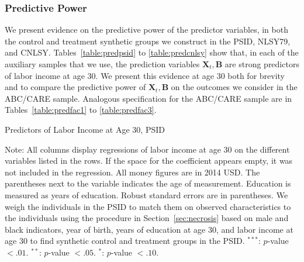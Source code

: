 \subsubsection{Predictive Power} \label{appendix:pred}

\noindent We present evidence on the predictive power of the predictor variables, in both the control and treatment synthetic groups we construct in the PSID, NLSY79, and CNLSY. Tables~\ref{table:predpsid} to \ref{table:predcnlsy} show that, in each of the auxiliary samples that we use, the prediction variables $\bm{X}_{t}, \bm{B}$ are strong predictors of labor income at age 30. We present this evidence at age 30 both for brevity and to compare the predictive power of $\bm{X}_{t},\bm{B}$ on the outcomes we consider in the ABC/CARE sample. Analogous specification for the ABC/CARE sample are in Tables~\ref{table:predfac1} to \ref{table:predfac3}.\\

\begin{table}
\begin{threeparttable}
\caption{Predictors of Labor Income at Age 30, PSID}
\label{table:predpsid}
\centering
\footnotesize

\begin{tablenotes}
\footnotesize
\item Note: All columns display regressions of labor income at age 30 on the different variables listed in the rows. If the space for the coefficient appears empty, it was not included in the regression. All money figures are in 2014 USD. The parentheses next to the variable indicates the age of measurement. Education is measured as years of education. Robust standard errors are in parentheses. We weigh the individuals in the PSID to match them on observed characteristics to the individuals using the procedure in Section~\ref{sec:necrosis} based on male and black indicators, year of birth, years of education at age 30, and labor income at age 30 to find synthetic control and treatment groups in the PSID. $^{***}$: $p$-value $< .01$. $^{**}$: $p$-value $< .05$. $^{*}$: $p$-value $< .10$.
\end{tablenotes}
\end{threeparttable}
\end{table}

